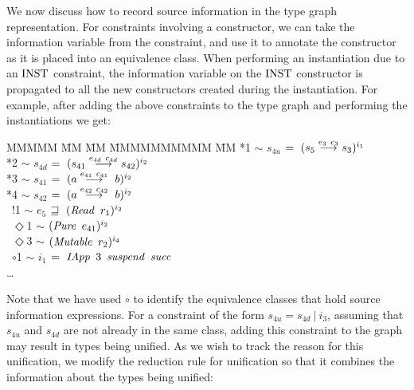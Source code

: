 We now discuss how to record source information in the type graph representation. For constraints involving a constructor, we can take the information variable from the constraint, and use it to annotate the constructor as it is placed into an equivalence class. When performing an instantiation due to an $\textrm{INST}$ constraint, the information variable on the $\textrm{INST}$ constructor is propagated to all the new constructors created during the instantiation. For example, after adding the above constraints to the type graph and performing the instantiations we get:

\begin{tabbing}
MMMMM	\= MM 	\= MM 		\= MMMMMMMMMM 		\= MM \kill
	\> *1	\> $\sim$	\> $s_{4u}$		
				\> $= \ (s_5 \stackrel{e_3 \ c_3}{\longrightarrow} s_3)^{i_1}$
	\\
	\> *2	\> $\sim$	\> $s_{4d}$
				\> $= \ (s_{41} \stackrel{e_{4d} \ c_{4d}}{\longrightarrow} s_{42})^{i_2}$ 
	\\
	\> *3	\> $\sim$	\> $s_{41}$		
				\> $= \ (a \lfuna{e_{41} \ c_{41}} \ b)^{i_2}$ 
	\\
	\> *4	\> $\sim$	\> $s_{42}$
				\> $= \ (a \lfuna{e_{42} \ c_{42}} \ b)^{i_2}$ 
	\\
	\> \ !1	\> $\sim$	\> $e_5$
				\> $\sqsupseteq \ (\operatorname{\mathit{Read}} \ r_1)^{i_2}$ 
	\\
	\> \ $\Diamond$1 \> $\sim$ 	\> $(\operatorname{\mathit{Pure}} \ e_{41})^{i_2}$ \\
	\> \ $\Diamond$3 \> $\sim$ 	\> $(\operatorname{\mathit{Mutable}} \ r_2)^{i_4}$ 
	\\
	\> \ $\circ$1 \> $\sim$	\> $i_1$ 	
				\> $= \ \iIApp \ 3 \ \isuspend \ \isucc$ \\
	\> \qq \dots 
\end{tabbing}

Note that we have used $\circ$ to identify the equivalence classes that hold source information expressions. For a constraint of the form $s_{4u} = s_{4d} \ | \ i_3$, assuming that $s_{4u}$ and $s_{4d}$ are not already in the same class, adding this constraint to the graph may result in types being unified. As we wish to track the reason for this unification, we modify the reduction rule for unification so that it combines the information about the types being unified:

